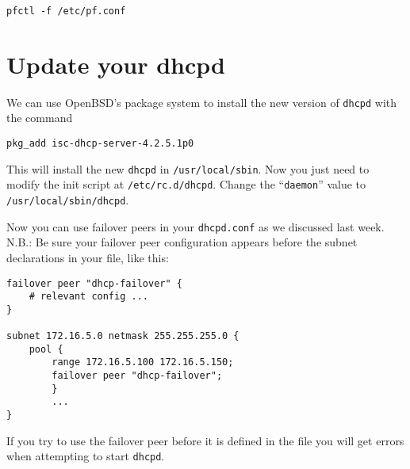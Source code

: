 \documentclass{article}
\begin{document}
\texttt{pfctl -f /etc/pf.conf}

\section{Update your dhcpd}
We can use OpenBSD's package system to install the new version of \texttt{dhcpd} with the command

\texttt{pkg\_add isc-dhcp-server-4.2.5.1p0}  

This will install the new \texttt{dhcpd} in \texttt{/usr/local/sbin}.  Now you just need to modify the init script at \texttt{/etc/rc.d/dhcpd}.  Change the ``\texttt{daemon}'' value to \texttt{/usr/local/sbin/dhcpd}.

Now you can use failover peers in your \texttt{dhcpd.conf} as we discussed last week.  N.B.: Be sure your failover peer configuration appears before the subnet declarations in your file, like this:

\begin{verbatim}
failover peer "dhcp-failover" {
    # relevant config ...
}

subnet 172.16.5.0 netmask 255.255.255.0 {
    pool {
        range 172.16.5.100 172.16.5.150;
        failover peer "dhcp-failover";
        }
        ...
}
\end{verbatim}

If you try to use the failover peer before it is defined in the file you will get errors when attempting to start \texttt{dhcpd}.
\end{document}
